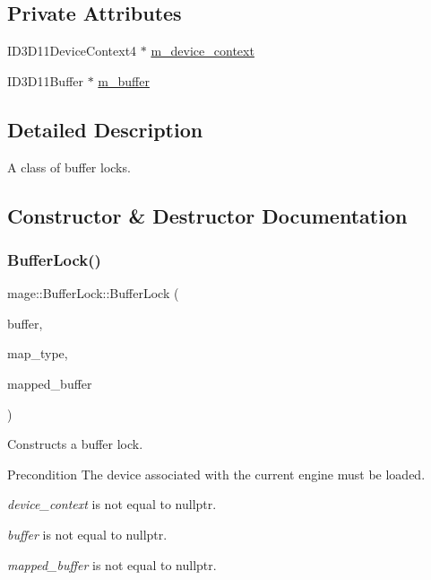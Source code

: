 \subsection*{Private Attributes}
\begin{DoxyCompactItemize}
\item 
I\+D3\+D11\+Device\+Context4 $\ast$ \hyperlink{classmage_1_1_buffer_lock_ac17b6d4085db4d9c7ebc57c66e9897b8}{m\+\_\+device\+\_\+context}
\item 
I\+D3\+D11\+Buffer $\ast$ \hyperlink{classmage_1_1_buffer_lock_a2b676d72e74c0083617e0ed288cc2be7}{m\+\_\+buffer}
\end{DoxyCompactItemize}


\subsection{Detailed Description}
A class of buffer locks. 

\subsection{Constructor \& Destructor Documentation}
\hypertarget{classmage_1_1_buffer_lock_a9e7c0ebe78a1abc7919afda7c7001bc8}{}\label{classmage_1_1_buffer_lock_a9e7c0ebe78a1abc7919afda7c7001bc8} 
\subsubsection{\texorpdfstring{Buffer\+Lock()}{BufferLock()}\hspace{0.1cm}{\footnotesize\ttfamily [1/4]}}
{\footnotesize\ttfamily mage\+::\+Buffer\+Lock\+::\+Buffer\+Lock (\begin{DoxyParamCaption}\item[{I\+D3\+D11\+Buffer $\ast$}]{buffer,  }\item[{D3\+D11\+\_\+\+M\+AP}]{map\+\_\+type,  }\item[{D3\+D11\+\_\+\+M\+A\+P\+P\+E\+D\+\_\+\+S\+U\+B\+R\+E\+S\+O\+U\+R\+CE $\ast$}]{mapped\+\_\+buffer }\end{DoxyParamCaption})\hspace{0.3cm}{\ttfamily [explicit]}}

Constructs a buffer lock.

\begin{DoxyPrecond}{Precondition}
The device associated with the current engine must be loaded. 

{\itshape device\+\_\+context} is not equal to {\ttfamily nullptr}. 

{\itshape buffer} is not equal to {\ttfamily nullptr}. 

{\itshape mapped\+\_\+buffer} is not equal to {\ttfamily nullptr}. 
\end{DoxyPrecond}


